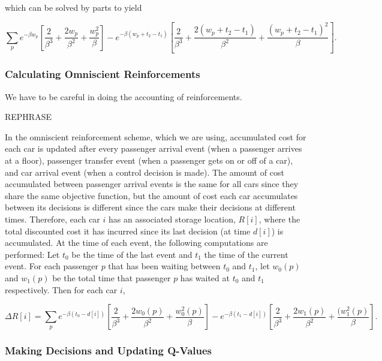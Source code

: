 which can be solved by parts to yield

\begin{equation}
    \sum_p e^{-\beta w_p} \left[\frac{2}{\beta^3} + \frac{2w_p}{\beta^2} + \frac{w_p^2}{\beta}  \right] - e^{-\beta(w_p + t_2 - t_1)} \left[ \frac{2}{\beta^3} + \frac{2(w_p + t_2 - t_1)}{\beta^2} + \frac{(w_p + t_2 - t_1)^2}{\beta} \right]. \label{eq:cost_reinforcement_sum}
\end{equation}

\subsubsection{Calculating Omniscient Reinforcements}

We have to be careful in doing the accounting of reinforcements.


{\color{red} REPHRASE}

In the omniscient reinforcement scheme, which we are using, accumulated cost for each car is updated after every passenger arrival event (when a passenger arrives at a floor), passenger transfer event (when a passenger gets on or off of a car), and car arrival event (when a control decision is made). The amount of cost accumulated between passenger arrival events is the same for all cars since they share the same objective function, but the amount of cost each car accumulates between its decisions is different since the cars make their decisions at different times. Therefore, each car $i$ has an associated storage location, $R[i]$, where the total discounted cost it has incurred since its last decision (at time $d[i]$) is accumulated. At the time of each event, the following computations are performed: Let $t_0$ be the time of the last event and $t_1$ the time of the current event. For each passenger $p$ that has been waiting between $t_0$ and $t_1$, let $w_0 (p)$ and $w_1(p)$ be the total time that passenger $p$ has waited at $t_0$ and $t_1$ respectively. Then for each car $i$,

\begin{equation}
   \Delta R[i] = \sum_p e^{-\beta (t_0 - d[i])} \left[\frac{2}{\beta^3} + \frac{2w_0(p)}{\beta^2} + \frac{w_0^2(p)}{\beta}  \right] - e^{-\beta(t_1 - d[i])} \left[ \frac{2}{\beta^3} + \frac{2w_1(p)}{\beta^2} + \frac{(w_1^2(p)}{\beta} \right]. \label{eq:cost_reinforcement_partial}
\end{equation}

\subsubsection{Making Decisions and Updating Q-Values}

